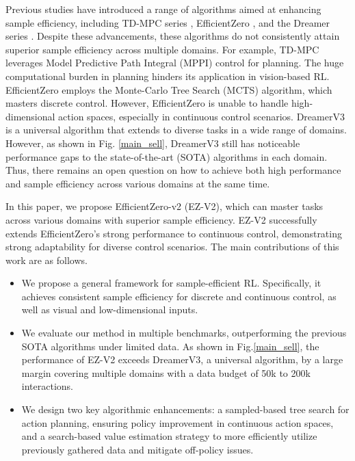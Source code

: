 Previous studies have introduced a range of algorithms aimed at enhancing sample efficiency, including TD-MPC series \citep{hansen2022temporal, Anonymous2023TDMPC2}, EfficientZero \citep{ye2021mastering}, and the Dreamer series \citep{hafner2019dream, hafner2021mastering, hafner2023mastering}. Despite these advancements, these algorithms do not consistently attain superior sample efficiency across multiple domains. For example, TD-MPC \citep{hansen2022temporal} leverages Model Predictive Path Integral (MPPI) \citep{rubinstein1997optimization} control for planning. The huge computational burden in planning hinders its application in vision-based RL.
EfficientZero \citep{ye2021mastering} employs the Monte-Carlo Tree Search (MCTS) algorithm, which masters discrete control. 
However, EfficientZero is unable to handle high-dimensional action spaces, especially in continuous control scenarios.
DreamerV3 \citep{hafner2023mastering} is a universal algorithm that extends to diverse tasks in a wide range of domains. However, as shown in Fig. \ref{main_sell}, DreamerV3 still has noticeable performance gaps to the state-of-the-art (SOTA) algorithms in each domain.
Thus, there remains an open question on how to achieve both high performance and sample efficiency across various domains at the same time. 


In this paper, we propose EfficientZero-v2 (EZ-V2), which can master tasks across various domains with superior sample efficiency.
EZ-V2 successfully extends EfficientZero's strong performance to continuous control, demonstrating strong adaptability for diverse control scenarios. 
The main contributions of this work are as follows. 
\begin{itemize}
    \item We propose a general framework for sample-efficient RL. Specifically, it achieves consistent sample efficiency for discrete and continuous control, as well as visual and low-dimensional inputs.
    \item We evaluate our method in multiple benchmarks, outperforming the previous SOTA algorithms under limited data. As shown in Fig.\ref{main_sell}, the performance of EZ-V2 exceeds DreamerV3, a universal algorithm, by a large margin covering multiple domains with a data budget of 50k to 200k interactions. 
    \item We design two key algorithmic enhancements: a sampled-based tree search for action planning, ensuring policy improvement in continuous action spaces, and a search-based value estimation strategy to more efficiently utilize previously gathered data and mitigate off-policy issues.
\end{itemize}

